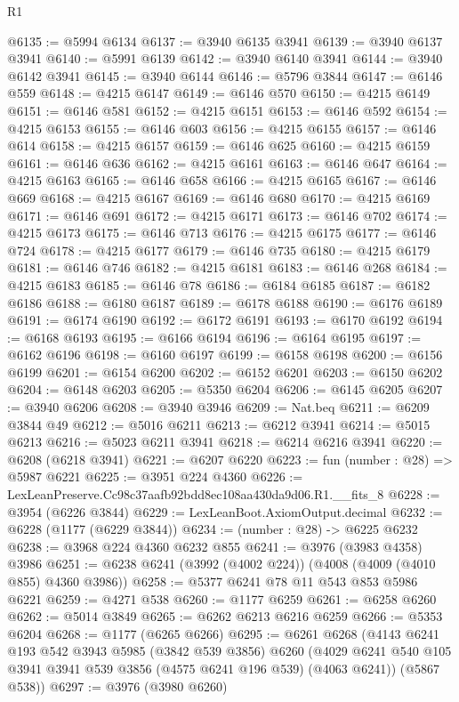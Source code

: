 \begin{lexlean}{R1}
\begin{coremodule}
@6135 := @5994 @6134
@6137 := @3940 @6135 @3941
@6139 := @3940 @6137 @3941
@6140 := @5991 @6139
@6142 := @3940 @6140 @3941
@6144 := @3940 @6142 @3941
@6145 := @3940 @6144
@6146 := @5796 @3844
@6147 := @6146 @559
@6148 := @4215 @6147
@6149 := @6146 @570
@6150 := @4215 @6149
@6151 := @6146 @581
@6152 := @4215 @6151
@6153 := @6146 @592
@6154 := @4215 @6153
@6155 := @6146 @603
@6156 := @4215 @6155
@6157 := @6146 @614
@6158 := @4215 @6157
@6159 := @6146 @625
@6160 := @4215 @6159
@6161 := @6146 @636
@6162 := @4215 @6161
@6163 := @6146 @647
@6164 := @4215 @6163
@6165 := @6146 @658
@6166 := @4215 @6165
@6167 := @6146 @669
@6168 := @4215 @6167
@6169 := @6146 @680
@6170 := @4215 @6169
@6171 := @6146 @691
@6172 := @4215 @6171
@6173 := @6146 @702
@6174 := @4215 @6173
@6175 := @6146 @713
@6176 := @4215 @6175
@6177 := @6146 @724
@6178 := @4215 @6177
@6179 := @6146 @735
@6180 := @4215 @6179
@6181 := @6146 @746
@6182 := @4215 @6181
@6183 := @6146 @268
@6184 := @4215 @6183
@6185 := @6146 @78
@6186 := @6184 @6185
@6187 := @6182 @6186
@6188 := @6180 @6187
@6189 := @6178 @6188
@6190 := @6176 @6189
@6191 := @6174 @6190
@6192 := @6172 @6191
@6193 := @6170 @6192
@6194 := @6168 @6193
@6195 := @6166 @6194
@6196 := @6164 @6195
@6197 := @6162 @6196
@6198 := @6160 @6197
@6199 := @6158 @6198
@6200 := @6156 @6199
@6201 := @6154 @6200
@6202 := @6152 @6201
@6203 := @6150 @6202
@6204 := @6148 @6203
@6205 := @5350 @6204
@6206 := @6145 @6205
@6207 := @3940 @6206
@6208 := @3940 @3946
@6209 := Nat.beq
@6211 := @6209 @3844 @49
@6212 := @5016 @6211
@6213 := @6212 @3941
@6214 := @5015 @6213
@6216 := @5023 @6211 @3941
@6218 := @6214 @6216 @3941
@6220 := @6208 (@6218 @3941)
@6221 := @6207 @6220
@6223 := fun (number : @28) => @5987 @6221
@6225 := @3951 @224 @4360
@6226 := LexLeanPreserve.Cc98c37aafb92bdd8ec108aa430da9d06.R1.__fits_8
@6228 := @3954 (@6226 @3844)
@6229 := LexLeanBoot.AxiomOutput.decimal
@6232 := @6228 (@1177 (@6229 @3844))
@6234 := (number : @28) -> @6225 @6232
@6238 := @3968 @224 @4360 @6232 @855
@6241 := @3976 (@3983 @4358) @3986
@6251 := @6238 @6241 (@3992 (@4002 @224)) (@4008 (@4009 (@4010 @855) @4360 @3986))
@6258 := @5377 @6241 @78 @11 @543 @853 @5986 @6221
@6259 := @4271 @538
@6260 := @1177 @6259
@6261 := @6258 @6260
@6262 := @5014 @3849
@6265 := @6262 @6213 @6216 @6259
@6266 := @5353 @6204
@6268 := @1177 (@6265 @6266)
@6295 := @6261
    @6268
    (@4143
      @6241
      @193
      @542
      @3943
      @5985
      (@3842 @539 @3856)
      @6260
      (@4029 @6241 @540 @105 @3941 @3941 @539 @3856 (@4575 @6241 @196 @539) (@4063 @6241))
      (@5867 @538))
@6297 := @3976 (@3980 @6260)

\end{coremodule}
\end{lexlean}
